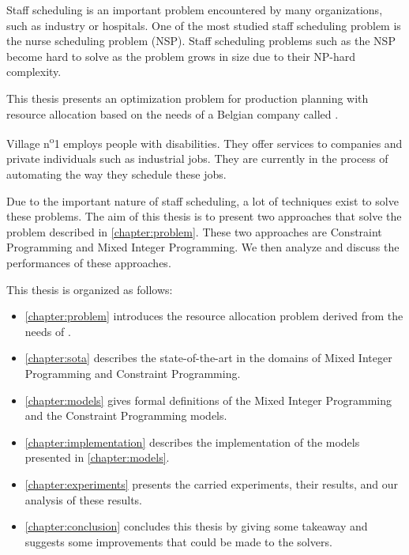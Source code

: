 \documentclass[../thesis.tex]{subfiles}
\begin{document}
Staff scheduling is an important problem encountered by many organizations, such as industry or hospitals.
One of the most studied staff scheduling problem is the nurse scheduling problem (NSP). 
Staff scheduling problems such as the NSP become hard to solve as the problem grows in size due to their NP-hard complexity.

This thesis presents an optimization problem for production planning with resource allocation based on the needs of a Belgian company called \vone.

Village n\textsuperscript{o}1 employs people with disabilities.
They offer services to companies and private individuals such as industrial jobs. They
are currently in the process of automating the way they schedule these jobs. 

Due to the important nature of staff scheduling, a lot of techniques exist to solve these problems. 
The aim of this thesis is to present two approaches that solve the problem described 
in \autoref{chapter:problem}. These two approaches are Constraint Programming and Mixed Integer Programming.
We then analyze and discuss the performances of these approaches.



This thesis is organized as follows:

\begin{itemize}
  \item[] \autoref{chapter:problem} introduces the resource allocation problem derived from the needs of \vone.
  \item[] \autoref{chapter:sota} describes the state-of-the-art in the domains of Mixed Integer Programming and Constraint Programming. 
  \item[] \autoref{chapter:models} gives formal definitions of the Mixed Integer Programming and the Constraint Programming models.
  \item[] \autoref{chapter:implementation} describes the implementation of the models presented in \autoref{chapter:models}.
  \item[] \autoref{chapter:experiments} presents the carried experiments, their results, and our analysis of these results.
  \item[] \autoref{chapter:conclusion} concludes this thesis by giving some takeaway and suggests some improvements that could be made to the solvers.
\end{itemize}
\end{document}
